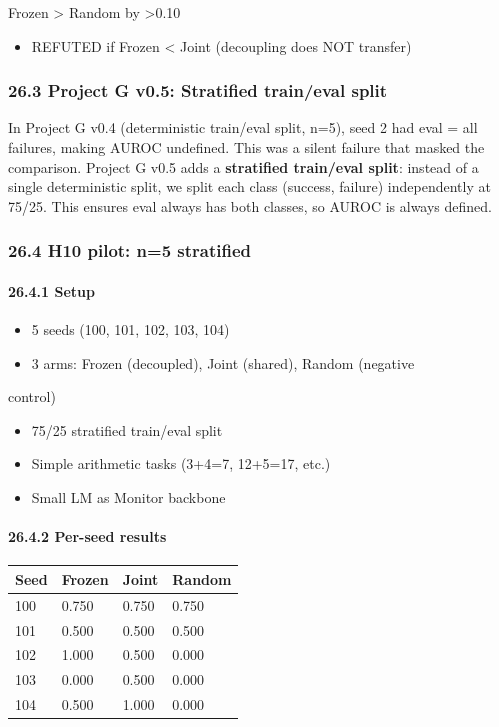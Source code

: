 \documentclass[11pt]{article}
\begin{document}
  Frozen > Random by >0.10
\begin{itemize}
  \item REFUTED if Frozen < Joint (decoupling does NOT transfer)
\end{itemize}


\subsubsection{26.3 Project G v0.5: Stratified train/eval split}

In Project G v0.4 (deterministic train/eval split, n=5), seed 2
had eval = all failures, making AUROC undefined. This was a
silent failure that masked the comparison. Project G v0.5 adds
a \textbf{stratified train/eval split}: instead of a single
deterministic split, we split each class (success, failure)
independently at 75/25. This ensures eval always has both
classes, so AUROC is always defined.

\subsubsection{26.4 H10 pilot: n=5 stratified}

\paragraph{26.4.1 Setup}

\begin{itemize}
  \item 5 seeds (100, 101, 102, 103, 104)
  \item 3 arms: Frozen (decoupled), Joint (shared), Random (negative
\end{itemize}

  control)
\begin{itemize}
  \item 75/25 stratified train/eval split
  \item Simple arithmetic tasks (3+4=7, 12+5=17, etc.)
  \item Small LM as Monitor backbone
\end{itemize}


\paragraph{26.4.2 Per-seed results}

\begin{tabular}{llll}
Seed & Frozen & Joint & Random \\
\hline
100 & 0.750 & 0.750 & 0.750 \\
101 & 0.500 & 0.500 & 0.500 \\
102 & 1.000 & 0.500 & 0.000 \\
103 & 0.000 & 0.500 & 0.000 \\
104 & 0.500 & 1.000 & 0.000 \\
\end{tabular}
\end{document}
